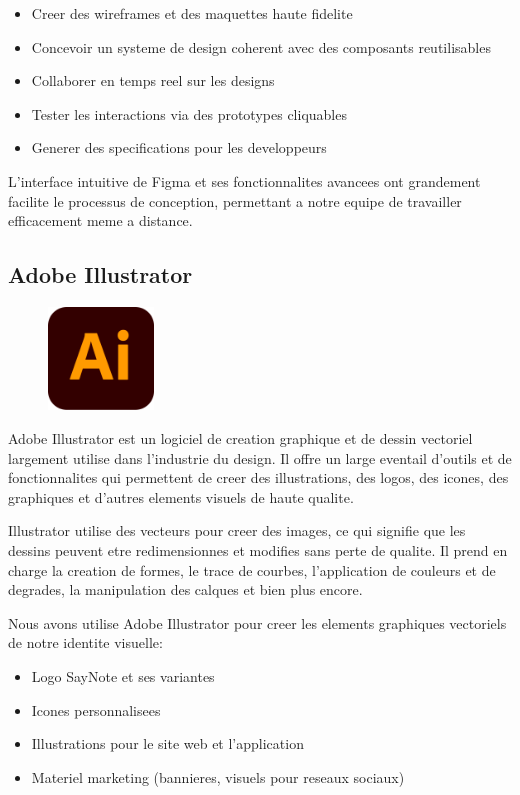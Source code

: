 \begin{itemize}
    \item Creer des wireframes et des maquettes haute fidelite
    \item Concevoir un systeme de design coherent avec des composants reutilisables
    \item Collaborer en temps reel sur les designs
    \item Tester les interactions via des prototypes cliquables
    \item Generer des specifications pour les developpeurs
\end{itemize}

L'interface intuitive de Figma et ses fonctionnalites avancees ont grandement facilite le processus de conception, permettant a notre equipe de travailler efficacement meme a distance.
\subsection{Adobe Illustrator}
\begin{figure}
    \centering
    \includegraphics[width=0.25\textwidth]{assets/docs/illustrator.png}
\end{figure}
Adobe Illustrator est un logiciel de creation graphique et de dessin vectoriel largement utilise dans l'industrie du design. Il offre un large eventail d'outils et de fonctionnalites qui permettent de creer des illustrations, des logos, des icones, des graphiques et d'autres elements visuels de haute qualite. 

Illustrator utilise des vecteurs pour creer des images, ce qui signifie que les dessins peuvent etre redimensionnes et modifies sans perte de qualite. Il prend en charge la creation de formes, le trace de courbes, l'application de couleurs et de degrades, la manipulation des calques et bien plus encore.

Nous avons utilise Adobe Illustrator pour creer les elements graphiques vectoriels de notre identite visuelle:

\begin{itemize}
    \item Logo SayNote et ses variantes
    \item Icones personnalisees
    \item Illustrations pour le site web et l'application
    \item Materiel marketing (bannieres, visuels pour reseaux sociaux)
\end{itemize}

